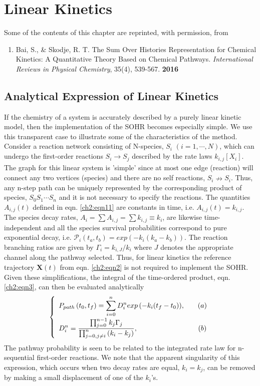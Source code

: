\chapter{Linear Kinetics}
\label{chapter:linear_kinetics}
Some of the contents of this chapter are reprinted, with permission, from \
\begin{enumerate}
\item[\cite{ch4_10_bai2016sum}] Bai, S., \& Skodje, R. T. The Sum Over Histories Representation for Chemical Kinetics: A Quantitative Theory Based on Chemical Pathways. \textit{International Reviews in Physical Chemistry}, 35(4), 539-567. \textbf{2016}
\end{enumerate}
\section{Analytical Expression of Linear Kinetics}
\label{ch2dot5:sec:analytical}
If the chemistry of a system is accurately described by a purely linear kinetic model,
then the implementation of the SOHR becomes especially simple. We use this transparent
case to illustrate some of the characteristics of the method. Consider a reaction network
consisting of N-species, $S_i$ $(i = 1, \cdots, N)$, which can undergo the first-order
reactions $S_i \xrightarrow[]{} S_j$ described by the rate laws $k_{i,j}[X_i]$. The graph for this linear system is
'simple' since at most one edge (reaction) will connect any two vertices (species) and
there are no self reactions, $S_i \nrightarrow S_i$. Thus, any n-step path can be uniquely represented
by the corresponding product of species, $S_0S_1 \cdots S_n$ and it is not necessary to specify
the reactions. The quantities $A_{i,j}(t)$ defined in eqn. \ref{ch2:eqn11} are constants in time, i.e.
$A_{i,j}(t) = k_{i,j}$. The species decay rates, $A_i = \sum{A_{i,j}} = \sum{k_{i,j}} \equiv k_i$, are likewise time-independent
and all the species survival probabilities correspond to pure exponential decay, i.e.
${\mathcal{P}}_{i}(t_a, t_b)=exp\left(-k_i(k_a-k_b)\right)$. The reaction branching ratios are given by $\Gamma_i=k_{i,J}/k_i$ where
$J$ denotes the appropriate channel along the pathway selected. Thus, for linear kinetics
the reference trajectory $\mathbf{X}(t)$ from eqn. \ref{ch2:eqn2} is not required to implement the
SOHR. Given these simplifications, the integral of the time-ordered product, eqn. \ref{ch2:eqn3}, can then be evaluated analytically\cite{ch1_IRPC_16_bai2014sum}
\begin{eqnarray}
  \twochoices
	{P_{path} \left(t_0, t_f \right) = \sum_{i=0}^{n}{D_i^n exp \left( -k_i(t_f - t_0) \right)}, && (a)}
	{D_i^n = \frac{\prod_{j=0}^{n-1}{k_j\Gamma_j}}{\prod_{j=0,j \neq i}^{n}{ \left( k_i - k_j \right) }}, && (b)}
\label{ch2dot5:eqn1}
\end{eqnarray}
The pathway probability is seen to be related to the integrated rate law for n-sequential
first-order reactions.\cite{ch1_IRPC_47_abel1906besonders} We note that the apparent singularity of this expression, which
occurs when two decay rates are equal, $k_i = k_j$, can be removed by making a small displacement
of one of the $k_i$'s.
\newline
